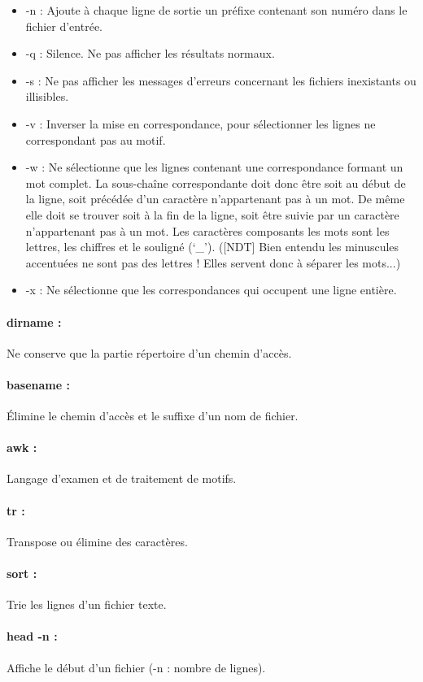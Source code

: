 \documentclass{article}[12pt]
\begin{document}
\begin{itemize}
\item -n : Ajoute à chaque ligne de sortie un préfixe contenant son numéro dans le fichier d'entrée.
\item -q : Silence. Ne pas afficher les résultats normaux.
\item -s : Ne pas afficher les messages d'erreurs concernant les fichiers inexistants ou illisibles.
\item -v : Inverser la mise en correspondance, pour sélectionner les lignes ne correspondant pas au motif.
\item -w : Ne sélectionne que les lignes contenant une correspondance formant un mot complet. La sous-chaîne correspondante doit donc être soit au début de la ligne, soit précédée d'un caractère n'appartenant pas à un mot. De même elle doit se trouver soit à la fin de la ligne, soit être suivie par un caractère n'appartenant pas à un mot. Les caractères composants les mots sont les lettres, les chiffres et le souligné (`\_'). ([NDT] Bien entendu les minuscules accentuées ne sont pas des lettres ! Elles servent donc à séparer les mots...)
\item -x : Ne sélectionne que les correspondances qui occupent une ligne entière.
\end{itemize}
\paragraph{dirname : } Ne conserve que la partie répertoire d'un chemin d'accès.
\paragraph{basename : } Élimine le chemin d'accès et le suffixe d'un nom de fichier.
\paragraph{awk : } Langage d'examen et de traitement de motifs.  
\paragraph{tr : } Transpose ou élimine des caractères.
\paragraph{sort : } Trie les lignes d'un fichier texte.
\paragraph{head -n : }  Affiche le début d'un fichier (-n : nombre de lignes).  
\end{document}

